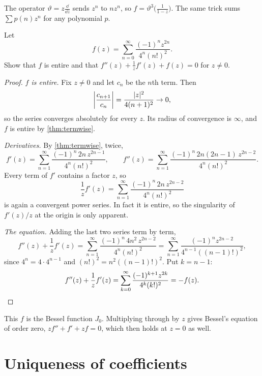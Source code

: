 \begin{remark}
  The operator $\vartheta = z \frac{\dd}{\dd z}$ sends $z^n$ to $n z^n$, so
  $f = \vartheta^3 \bigl(\frac{1}{1-z}\bigr)$. The same trick sums
  $\sum p(n) z^n$ for any polynomial $p$.
\end{remark}

\begin{exercise}\label{ex:bessel}
  Let
  \[
    f(z) = \sum_{n=0}^{\infty} \frac{(-1)^n z^{2n}}{4^n (n!)^2}.
  \]
  Show that $f$ is entire and that
  $f''(z) + \frac{1}{z} f'(z) + f(z) = 0$ for $z \neq 0$.
\end{exercise}

\begin{proof}
  \emph{$f$ is entire.} Fix $z \neq 0$ and let $c_n$ be the $n$th term. Then
  \[
    \abs*{\frac{c_{n+1}}{c_n}} = \frac{\abs{z}^2}{4(n+1)^2} \to 0,
  \]
  so the series converges absolutely for every $z$. Its radius of convergence
  is $\infty$, and $f$ is entire by \cref{thm:termwise}.

  \emph{Derivatives.} By \cref{thm:termwise}, twice,
  \[
    f'(z) = \sum_{n=1}^{\infty} \frac{(-1)^n \, 2n \, z^{2n-1}}{4^n (n!)^2},
    \qquad
    f''(z) = \sum_{n=1}^{\infty}
      \frac{(-1)^n \, 2n(2n-1) \, z^{2n-2}}{4^n (n!)^2}.
  \]
  Every term of $f'$ contains a factor $z$, so
  \[
    \frac{1}{z} f'(z)
    = \sum_{n=1}^{\infty} \frac{(-1)^n \, 2n \, z^{2n-2}}{4^n (n!)^2}
  \]
  is again a convergent power series. In fact it is entire, so the
  singularity of $f'(z)/z$ at the origin is only apparent.

  \emph{The equation.} Adding the last two series term by term,
  \[
    f''(z) + \frac{1}{z} f'(z)
    = \sum_{n=1}^{\infty} \frac{(-1)^n \, 4n^2 \, z^{2n-2}}{4^n (n!)^2}
    = \sum_{n=1}^{\infty} \frac{(-1)^n z^{2n-2}}{4^{n-1} ((n-1)!)^2},
  \]
  since $4^n = 4 \cdot 4^{n-1}$ and $(n!)^2 = n^2 ((n-1)!)^2$. Put $k = n - 1$:
  \[
    f''(z) + \frac{1}{z} f'(z)
    = \sum_{k=0}^{\infty} \frac{(-1)^{k+1} z^{2k}}{4^k (k!)^2}
    = -f(z). \qedhere
  \]
\end{proof}

\begin{remark}
  This $f$ is the Bessel function $J_0$. Multiplying through by $z$ gives
  Bessel's equation of order zero, $z f'' + f' + z f = 0$, which then holds
  at $z = 0$ as well.
\end{remark}

\section{Uniqueness of coefficients}\label{sec:uniqueness}

